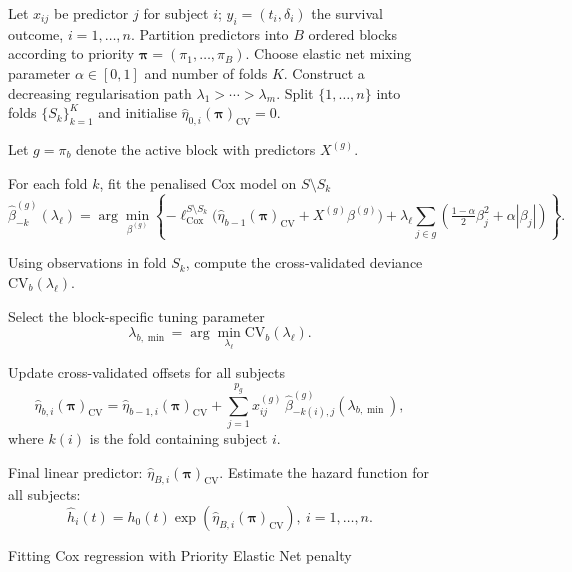 {\small
\begin{figure}[htbp]

\caption{Fitting Cox regression with Priority Elastic Net penalty}
\label{alg:priority_elastic_net}
\begin{algorithmic}[1]

\STATE Let $x_{ij}$ be predictor $j$ for subject $i$; $y_i=(t_i,\delta_i)$ the survival outcome, $i=1,\ldots,n$.
\STATE Partition predictors into $B$ ordered blocks according to priority $\bm{\pi}=(\pi_1,\dots,\pi_B)$.
\STATE Choose elastic net mixing parameter $\alpha\in[0,1]$ and number of folds $K$.
\STATE Construct a decreasing regularisation path $\lambda_1>\cdots>\lambda_m$.
\STATE Split $\{1,\ldots,n\}$ into folds $\{S_k\}_{k=1}^K$ and initialise $\hat{\eta}_{0,i}(\bm{\pi})_{\mathrm{CV}}=0$.

    \STATE Let $g=\pi_b$ denote the active block with predictors $X^{(g)}$.

        \STATE For each fold $k$, fit the penalised Cox model on $S\setminus S_k$
        \[
        \hat{\beta}^{(g)}_{-k}(\lambda_\ell)
        =
        \arg\min_{\beta^{(g)}}
        \left\{
        -\ell_{\mathrm{Cox}}^{S\setminus S_k}\!\big(\hat{\eta}_{b-1}(\bm{\pi})_{\mathrm{CV}} + X^{(g)}\beta^{(g)}\big)
        +
        \lambda_\ell \sum_{j\in g}\!\left(\tfrac{1-\alpha}{2}\beta_j^2+\alpha|\beta_j|\right)
        \right\}.
        \]

        \STATE Using observations in fold $S_k$, compute the cross-validated deviance $\mathrm{CV}_b(\lambda_\ell)$.
    \ENDFOR

    \STATE Select the block-specific tuning parameter
    \[
    \lambda_{b,\min}=\arg\min_{\lambda_\ell}\mathrm{CV}_b(\lambda_\ell).
    \]

    \STATE Update cross-validated offsets for all subjects
    \[
    \hat{\eta}_{b,i}(\bm{\pi})_{\mathrm{CV}}
    =
    \hat{\eta}_{b-1,i}(\bm{\pi})_{\mathrm{CV}}
    +
    \sum_{j=1}^{p_g} x^{(g)}_{ij}\,\hat{\beta}^{(g)}_{-k(i),j}(\lambda_{b,\min}),
    \]
    where $k(i)$ is the fold containing subject $i$.
\ENDFOR

\STATE Final linear predictor: $\hat{\eta}_{B,i}(\bm{\pi})_{\mathrm{CV}}$.
\STATE Estimate the hazard function for all subjects:
\[
\hat{h}_i(t)=h_0(t)\exp\!\left(\hat{\eta}_{B,i}(\bm{\pi})_{\mathrm{CV}}\right), \ i=1,\ldots, n.
\]

\end{algorithmic}
\end{figure}
}

